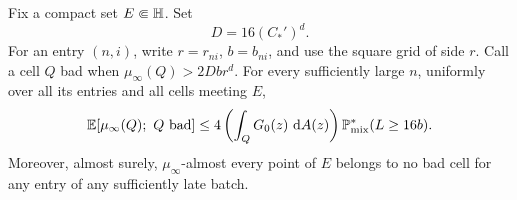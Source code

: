 \begin{lemma}
\label{hd:bad-cells}
Fix a compact set \(E\Subset\mathbb H\). Set
\[
 D=16(C_*')^d.
\]
For an entry \((n,i)\), write \(r=r_{ni}\), \(b=b_{ni}\), and use
the square grid of side \(r\). Call a cell \(Q\) bad when
\(\mu_\infty(Q)>2Dbr^d\).
For every sufficiently large \(n\), uniformly over all its entries
and all cells meeting \(E\),
\begin{equation}
 \mathbb E[\mu_\infty(Q);\ Q\text{ bad}]
 \le
 4\left(\int_QG_0(z)\,\mathop{}\!\mathrm{d} A(z)\right)
       \mathbb P^*_{\mathrm{mix}}(L\ge16b).
 \label{hd:bad-mass}
\end{equation}
Moreover, almost surely, \(\mu_\infty\)-almost every point of \(E\)
belongs to no bad cell for any entry of any sufficiently late
batch.
\end{lemma}

